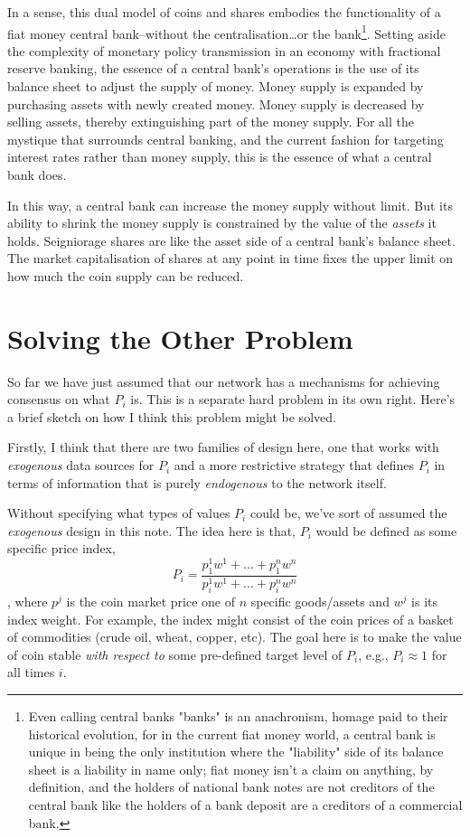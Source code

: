 \documentclass[twocolumn]{article}
\begin{document}
In a sense, this dual model of coins and shares embodies the
functionality of a fiat money central bank--without the
centralisation\dots or the bank\footnote{Even calling central banks
  "banks" is an anachronism, homage paid to their historical
  evolution, for in the current fiat money world, a central bank is
  unique in being the only institution where the "liability" side of
  its balance sheet is a liability in name only; fiat money isn't a
  claim on anything, by definition, and the holders of national bank
  notes are not creditors of the central bank like the holders of a
  bank deposit are a creditors of a commercial bank.}. Setting aside
the complexity of monetary policy transmission in an economy with
fractional reserve banking, the essence of a central bank's operations
is the use of its balance sheet to adjust the supply of money. Money
supply is expanded by purchasing assets with newly created
money. Money supply is decreased by selling assets, thereby
extinguishing part of the money supply. For all the mystique that
surrounds central banking, and the current fashion for targeting
interest rates rather than money supply, this is the essence of what a
central bank does.

In this way, a central bank can increase the money supply without
limit. But its ability to shrink the money supply is constrained by
the value of the \emph{assets} it holds. Seigniorage shares are like
the asset side of a central bank's balance sheet. The market
capitalisation of shares at any point in time fixes the upper limit on
how much the coin supply can be reduced.

\section*{Solving the Other Problem}
So far we have just assumed that our network has a mechanisms for
achieving consensus on what $P_{i}$ is. This is a separate hard
problem in its own right. Here's a brief sketch on how I think this
problem might be solved.

Firstly, I think that there are two families of design here, one that
works with \emph{exogenous} data sources for $P_{i}$ and a more
restrictive strategy that defines $P_{i}$ in terms of information that
is purely \emph{endogenous} to the network itself.

Without specifying what types of values $P_{i}$ could be, we've sort
of assumed the \emph{exogenous} design in this note. The idea here is
that, $P_{i}$ would be defined as some specific price index,
\begin{equation}
P_{i} = \frac{p^{1}_{1}w^{1} + \dots + p^{n}_{1}w^{n}}{p^{1}_{i}w^{1} + \dots + p^{n}_{i}w^{n}}
\end{equation}
, where $p^{j}$ is the coin market price one of $n$ specific
goods/assets and $w^{j}$ is its index weight. For example, the index
might consist of the coin prices of a basket of commodities (crude
oil, wheat, copper, etc). The goal here is to make the value of coin
stable \emph{with respect to} some pre-defined target level of
$P_{i}$, e.g., $P_{i} \approx 1$ for all times $i$.
\end{document}
